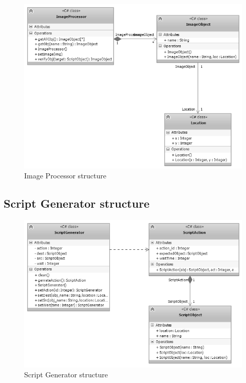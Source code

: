 	\begin{figure}[H]
		\centering
		\includegraphics[scale=0.75]{Chapters/Fig/img_processor.png}
		\caption{Image Processor structure}
		\label{fig:img_processor}
	\end{figure}

\subsection{Script Generator structure}

	\begin{figure}[H]
		\centering
		\includegraphics[scale=0.75]{Chapters/Fig/script_gen.png}
		\caption{Script Generator structure}
		\label{fig:script_gen}
	\end{figure}

